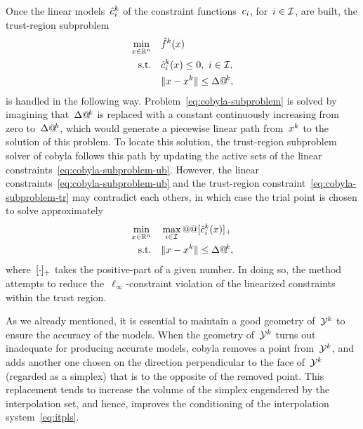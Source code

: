 Once the linear models~$\conm[k]{i}$ of the constraint functions~$c_{i}$, for~$i \in \mathcal{I}$, are built, the trust-region subproblem
\begin{subequations}
    \label{eq:cobyla-subproblem}
    \begin{align}
        \min_{\iter \in \R^n}   & \quad \objm[k](\iter)\\
        \text{s.t.}             & \quad \conm[k]{i}(\iter) \le 0, ~ i \in \iub, \label{eq:cobyla-subproblem-ub}\\
                                & \quad \norm{\iter - \iter[k]} \le \rad[k], \label{eq:cobyla-subproblem-tr}
    \end{align}
\end{subequations}
is handled in the following way.
Problem~\cref{eq:cobyla-subproblem} is solved by imagining that~$\rad[k]$ is replaced with a constant continuously increasing from zero to~$\rad[k]$, which would generate a piecewise linear path from~$\iter[k]$ to the solution of this problem.
To locate this solution, the trust-region subproblem solver of \gls{cobyla} follows this path by updating the active sets of the linear constraints~\cref{eq:cobyla-subproblem-ub}.
However, the linear constraints~\cref{eq:cobyla-subproblem-ub} and the trust-region constraint~\cref{eq:cobyla-subproblem-tr} may contradict each others, in which case the trial point is chosen to solve approximately
\begin{align*}
    \min_{\iter \in \R^n}   & \quad \max_{i \in \iub} @@ \posp{\conm[k]{i}(\iter)}\\
    \text{s.t.}             & \quad \norm{\iter - \iter[k]} \le \rad[k],
\end{align*}
%
where~$[\cdot]_+$ takes the positive-part of a given number.
In doing so, the method attempts to reduce the~$\ell_{\infty}$-constraint violation of the linearized constraints within the trust region.

As we already mentioned, it is essential to maintain a good geometry of~$\xpt[k]$ to ensure the accuracy of the models.
When the geometry of~$\xpt[k]$ turns out inadequate for producing accurate models, \gls{cobyla} removes a point from~$\xpt[k]$, and adds another one chosen on the direction perpendicular to the face of~$\xpt[k]$ (regarded as a simplex) that is to the opposite of the removed point.
This replacement tends to increase the volume of the simplex engendered by the interpolation set, and hence, improves the conditioning of the interpolation system~\cref{eq:itpls}.

